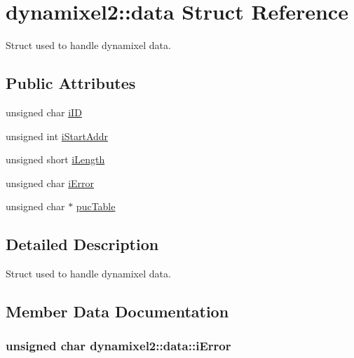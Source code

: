 \hypertarget{structdynamixel2_1_1data}{}\section{dynamixel2\+:\+:data Struct Reference}
\label{structdynamixel2_1_1data}


Struct used to handle dynamixel data.  


\subsection*{Public Attributes}
\begin{DoxyCompactItemize}
\item 
unsigned char \hyperlink{structdynamixel2_1_1data_ab60c037af9dfe1f3c62f15d0581a5837}{i\+I\+D}
\item 
unsigned int \hyperlink{structdynamixel2_1_1data_adfeca69c1b405b26a9381d53e3954156}{i\+Start\+Addr}
\item 
unsigned short \hyperlink{structdynamixel2_1_1data_a7d8d57614c387663f0658bbf4b7a69eb}{i\+Length}
\item 
unsigned char \hyperlink{structdynamixel2_1_1data_a1c974bc78558d2a55f9a7c647cbb36f5}{i\+Error}
\item 
unsigned char $\ast$ \hyperlink{structdynamixel2_1_1data_ae06fa51258979434fbc9f0e128824950}{puc\+Table}
\end{DoxyCompactItemize}


\subsection{Detailed Description}
Struct used to handle dynamixel data. 

\subsection{Member Data Documentation}
\hypertarget{structdynamixel2_1_1data_a1c974bc78558d2a55f9a7c647cbb36f5}{}
\subsubsection[{i\+Error}]{\setlength{\rightskip}{0pt plus 5cm}unsigned char dynamixel2\+::data\+::i\+Error}\label{structdynamixel2_1_1data_a1c974bc78558d2a55f9a7c647cbb36f5}
\hypertarget{structdynamixel2_1_1data_ab60c037af9dfe1f3c62f15d0581a5837}{}

